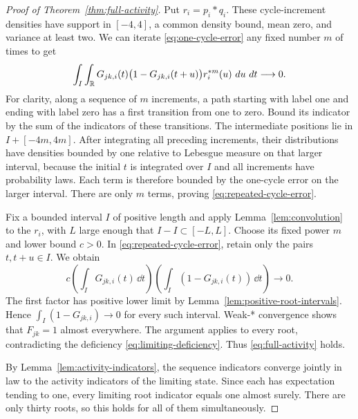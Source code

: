 \begin{proof}[Proof of Theorem~\ref{thm:full-activity}]
Put $r_i=p_i*q_i$.  These cycle-increment densities have support in
$[-4,4]$, a common density bound, mean zero, and variance at least two.
We can iterate \eqref{eq:one-cycle-error} any fixed number $m$ of times
to get
\begin{equation}\label{eq:repeated-cycle-error}
 \int_I\int_\mathbb R
 G_{jk,i}(t)\bigl(1-G_{jk,i}(t+u)\bigr)
 r_i^{*m}(u)\,\mathop{}\!d u\,\mathop{}\!d t\longrightarrow0.
\end{equation}
For clarity, along a sequence of $m$ increments, a path starting with
label one and ending with label zero has a first transition from one
to zero.  Bound its indicator by the sum of the indicators of these
transitions.  The intermediate positions lie in
$I+[-4m,4m]$.  After integrating all preceding increments, their
distributions have densities bounded by one relative to Lebesgue
measure on that larger interval, because the initial $t$ is integrated
over $I$ and all increments have probability laws.  Each term is
therefore bounded by the one-cycle error on the larger interval.
There are only $m$ terms, proving \eqref{eq:repeated-cycle-error}.

Fix a bounded interval $I$ of positive length and apply
Lemma~\ref{lem:convolution} to the $r_i$, with $L$ large enough that
$I-I\subset[-L,L]$.  Choose its fixed power $m$ and lower bound
$c>0$.  In \eqref{eq:repeated-cycle-error}, retain only the pairs
$t,t+u\in I$.  We obtain
\[
 c\left(\int_I G_{jk,i}(t)\,\dd t\right)
   \left(\int_I(1-G_{jk,i}(t))\,\dd t\right)
 \longrightarrow0.
\]
The first factor has positive lower limit by
Lemma~\ref{lem:positive-root-intervals}.  Hence
$\int_I(1-G_{jk,i})\to0$ for every such interval.  Weak-* convergence
shows that $F_{jk}=1$ almost everywhere.  The argument applies to every
root, contradicting the deficiency
\eqref{eq:limiting-deficiency}.  Thus \eqref{eq:full-activity} holds.

By Lemma~\ref{lem:activity-indicators}, the sequence indicators converge
jointly in law to the activity indicators of the limiting state.  Since
each has expectation tending to one, every limiting root indicator
equals one almost surely.  There are only thirty roots, so this holds
for all of them simultaneously.
\end{proof}
